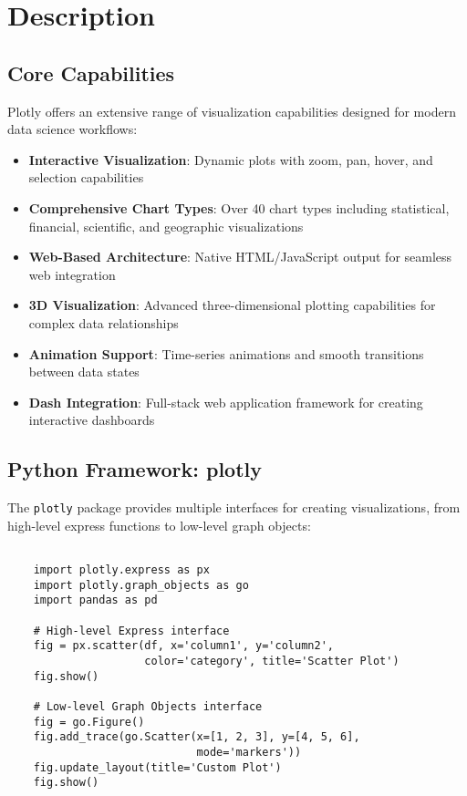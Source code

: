\section{Description}
\label{sec:description}

\subsection{Core Capabilities}
\label{subsec:capabilities}

Plotly offers an extensive range of visualization capabilities designed for modern data science workflows:

\begin{itemize}
	\item \textbf{Interactive Visualization}: Dynamic plots with zoom, pan, hover, and selection capabilities
	\item \textbf{Comprehensive Chart Types}: Over 40 chart types including statistical, financial, scientific, and geographic visualizations
	\item \textbf{Web-Based Architecture}: Native HTML/JavaScript output for seamless web integration
	\item \textbf{3D Visualization}: Advanced three-dimensional plotting capabilities for complex data relationships
	\item \textbf{Animation Support}: Time-series animations and smooth transitions between data states
	\item \textbf{Dash Integration}: Full-stack web application framework for creating interactive dashboards
\end{itemize}



\subsection{Python Framework: plotly}
\label{subsec:plotly}

The \texttt{plotly} package provides multiple interfaces for creating visualizations, from high-level express functions to low-level graph objects:

\begin{lstlisting}[language=MyPython, caption={Plotly Core Interfaces}, label={lst:plotly_core}]
	
	import plotly.express as px
	import plotly.graph_objects as go
	import pandas as pd
	
	# High-level Express interface
	fig = px.scatter(df, x='column1', y='column2', 
	                 color='category', title='Scatter Plot')
	fig.show()
	
	# Low-level Graph Objects interface
	fig = go.Figure()
	fig.add_trace(go.Scatter(x=[1, 2, 3], y=[4, 5, 6], 
	                         mode='markers'))
	fig.update_layout(title='Custom Plot')
	fig.show()
	
\end{lstlisting}


